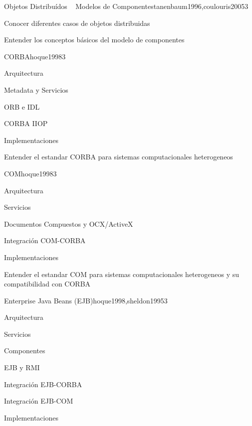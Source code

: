 \begin{syllabus}
\begin{unit}{Objetos Distribuídos ~ Modelos de Componentes}{tanenbaum1996,coulouris2005}{3}
   \begin{learningoutcomes}
      \item Conocer diferentes casos de objetos distribuidas
      \item Entender los conceptos básicos del modelo de componentes
   \end{learningoutcomes}
\end{unit}

\begin{unit}{CORBA}{hoque1998}{3}
   \begin{topics}
      \item Arquitectura
      \item Metadata y Servicios
      \item ORB e IDL
      \item CORBA IIOP
      \item Implementaciones
   \end{topics}

   \begin{learningoutcomes}
      \item Entender el estandar CORBA para sistemas computacionales heterogeneos
   \end{learningoutcomes}
\end{unit}

\begin{unit}{COM}{hoque1998}{3}
   \begin{topics}
      \item Arquitectura
      \item Servicios
      \item Documentos Compuestos y OCX/ActiveX
      \item Integración COM-CORBA
      \item Implementaciones
   \end{topics}

   \begin{learningoutcomes}
      \item  Entender el estandar COM para sistemas computacionales heterogeneos y su compatibilidad con CORBA
   \end{learningoutcomes}
\end{unit}

\begin{unit}{Enterprise Java Beans (EJB)}{hoque1998,sheldon1995}{3}
   \begin{topics}
      \item Arquitectura
      \item Servicios
      \item Componentes
      \item EJB y RMI
      \item Integración EJB-CORBA
      \item Integración EJB-COM
      \item Implementaciones
   \end{topics}


\end{unit}
\end{syllabus}
